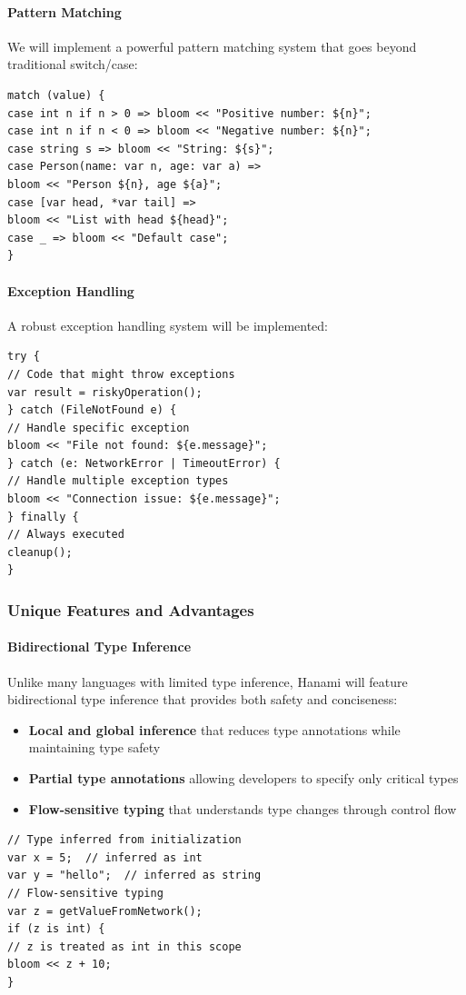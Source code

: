 \documentclass[conference]{IEEEtran}
\begin{document}
\paragraph{Pattern Matching}
We will implement a powerful pattern matching system that goes beyond traditional switch/case:
\begin{verbatim}
match (value) {
case int n if n > 0 => bloom << "Positive number: ${n}";
case int n if n < 0 => bloom << "Negative number: ${n}";
case string s => bloom << "String: ${s}";
case Person(name: var n, age: var a) =>
bloom << "Person ${n}, age ${a}";
case [var head, *var tail] =>
bloom << "List with head ${head}";
case _ => bloom << "Default case";
}
\end{verbatim}
\paragraph{Exception Handling}
A robust exception handling system will be implemented:
\begin{verbatim}
try {
// Code that might throw exceptions
var result = riskyOperation();
} catch (FileNotFound e) {
// Handle specific exception
bloom << "File not found: ${e.message}";
} catch (e: NetworkError | TimeoutError) {
// Handle multiple exception types
bloom << "Connection issue: ${e.message}";
} finally {
// Always executed
cleanup();
}
\end{verbatim}
\subsubsection{Unique Features and Advantages}
\paragraph{Bidirectional Type Inference}
Unlike many languages with limited type inference, Hanami will feature bidirectional type inference that provides both safety and conciseness:
\begin{itemize}
\item \textbf{Local and global inference} that reduces type annotations while maintaining type safety
\item \textbf{Partial type annotations} allowing developers to specify only critical types
\item \textbf{Flow-sensitive typing} that understands type changes through control flow
\end{itemize}
\begin{verbatim}
// Type inferred from initialization
var x = 5;  // inferred as int
var y = "hello";  // inferred as string
// Flow-sensitive typing
var z = getValueFromNetwork();
if (z is int) {
// z is treated as int in this scope
bloom << z + 10;
}
\end{verbatim}
\end{document}
